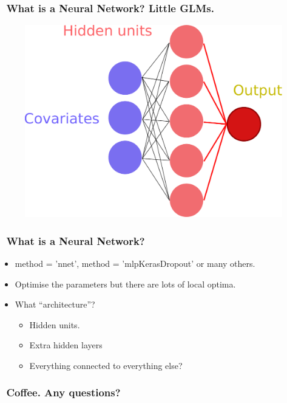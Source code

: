 \documentclass[handout, aspectratio = 169]{beamer}
\begin{document}
\begin{frame}
\frametitle{\insertframenumber~What is a Neural Network? Little GLMs.}

\vspace{6mm}
\begin{figure}
    \includegraphics[height = 0.7\textheight]{neural_network3.pdf}
\end{figure} 
\end{frame} 



\begin{frame}
\frametitle{\insertframenumber~What is a Neural Network?}

\begin{itemize}
\item method = 'nnet', method = 'mlpKerasDropout' or many others.
\item Optimise the parameters but there are lots of local optima.
\item What ``architecture''?
	\begin{itemize}
	\item Hidden units.
	\item Extra hidden layers
	\item Everything connected to everything else?
	\end{itemize}
\end{itemize}
\end{frame} 







\begin{frame}
\frametitle{\insertframenumber~Coffee. Any questions?}


\end{frame} 
\end{document}
